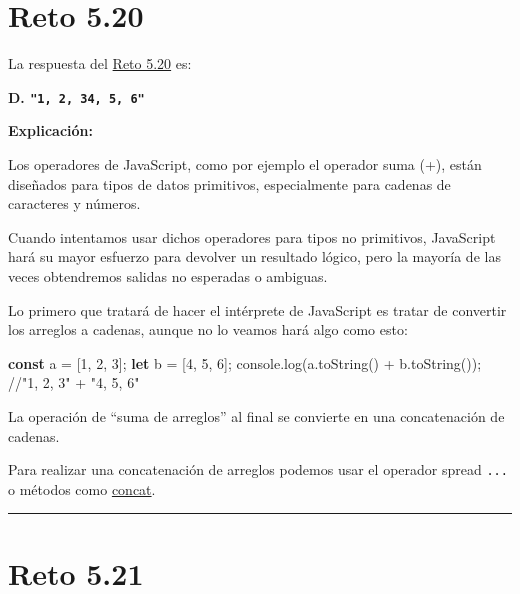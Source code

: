 \documentclass[
  letterpaper,
  DIV=11,
  numbers=noendperiod]{scrreprt}
\newenvironment{Shaded}{\begin{snugshade}}{\end{snugshade}}
\newcommand{\BuiltInTok}[1]{\textcolor[rgb]{0.00,0.23,0.31}{#1}}
\newcommand{\CommentTok}[1]{\textcolor[rgb]{0.37,0.37,0.37}{#1}}
\newcommand{\DecValTok}[1]{\textcolor[rgb]{0.68,0.00,0.00}{#1}}
\newcommand{\FunctionTok}[1]{\textcolor[rgb]{0.28,0.35,0.67}{#1}}
\newcommand{\KeywordTok}[1]{\textcolor[rgb]{0.00,0.23,0.31}{\textbf{#1}}}
\newcommand{\NormalTok}[1]{\textcolor[rgb]{0.00,0.23,0.31}{#1}}
\newcommand{\OperatorTok}[1]{\textcolor[rgb]{0.37,0.37,0.37}{#1}}
\begin{document}
\section{Reto 5.20}\label{sec-sol-cap5-reto20}

La respuesta del \hyperref[sec-cap5-reto20]{Reto 5.20} es:

\textbf{D. \texttt{"1,\ 2,\ 34,\ 5,\ 6"}}

\textbf{Explicación:}

Los operadores de JavaScript, como por ejemplo el operador suma (+),
están diseñados para tipos de datos primitivos, especialmente para
cadenas de caracteres y números.

Cuando intentamos usar dichos operadores para tipos no primitivos,
JavaScript hará su mayor esfuerzo para devolver un resultado lógico,
pero la mayoría de las veces obtendremos salidas no esperadas o
ambiguas.

Lo primero que tratará de hacer el intérprete de JavaScript es tratar de
convertir los arreglos a cadenas, aunque no lo veamos hará algo como
esto:

\begin{Shaded}
\begin{Highlighting}[]
\KeywordTok{const}\NormalTok{ a }\OperatorTok{=}\NormalTok{ [}\DecValTok{1}\OperatorTok{,} \DecValTok{2}\OperatorTok{,} \DecValTok{3}\NormalTok{]}\OperatorTok{;}
\KeywordTok{let}\NormalTok{ b }\OperatorTok{=}\NormalTok{ [}\DecValTok{4}\OperatorTok{,} \DecValTok{5}\OperatorTok{,} \DecValTok{6}\NormalTok{]}\OperatorTok{;}
\BuiltInTok{console}\OperatorTok{.}\FunctionTok{log}\NormalTok{(a}\OperatorTok{.}\FunctionTok{toString}\NormalTok{() }\OperatorTok{+}\NormalTok{ b}\OperatorTok{.}\FunctionTok{toString}\NormalTok{())}\OperatorTok{;} 
\CommentTok{//"1, 2, 3" + "4, 5, 6"}
\end{Highlighting}
\end{Shaded}

La operación de ``suma de arreglos'' al final se convierte en una
concatenación de cadenas.

Para realizar una concatenación de arreglos podemos usar el operador
spread \texttt{...} o métodos como \hyperref[glos-concat]{concat}.

\begin{center}\rule{0.5\linewidth}{0.5pt}\end{center}

\section{Reto 5.21}\label{sec-sol-cap5-reto21}
\end{document}
